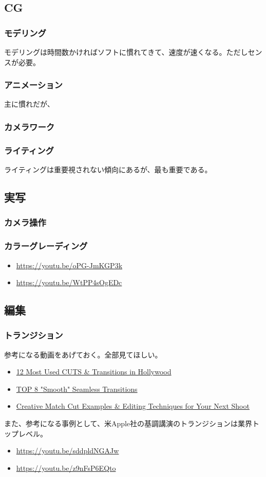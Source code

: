 \documentclass[dvipdfmx,jb5]{jreport}
\newcommand{\link}[2]{\href{#2}{#1}}
\begin{document}
\subsection{CG}
\subsubsection{モデリング}
モデリングは時間数かければソフトに慣れてきて、速度が速くなる。ただしセンスが必要。
\subsubsection{アニメーション}
主に慣れだが、
\subsubsection{カメラワーク}
\subsubsection{ライティング}
ライティングは重要視されない傾向にあるが、最も重要である。
\subsection{実写}
\subsubsection{カメラ操作}
\subsubsection{カラーグレーディング}
\begin{itemize}
      \item \url{https://youtu.be/oPG-JmKGP3k}
      \item \url{https://youtu.be/WtPP4sOgEDc}
\end{itemize}
\subsection{編集}
\subsubsection{トランジション}
参考になる動画をあげておく。全部見てほしい。
\begin{itemize}
      \item \link{12 Most Used CUTS \& Transitions in Hollywood}{https://youtu.be/VVTZNg-IgGI}
      \item \link{TOP 8 "Smooth" Seamless Transitions}{https://youtu.be/t5k7feqZUD0}
      \item \link{Creative Match Cut Examples \& Editing Techniques for Your Next Shoot}{https://youtu.be/ptXlYulVAsM}
\end{itemize}
また、参考になる事例として、米Apple社の基調講演のトランジションは業界トップレベル。
\begin{itemize}
      \item \url{https://youtu.be/sddpldNGAJw}
      \item \url{https://youtu.be/z9nFsP6EQto}
\end{itemize}
\end{document}
